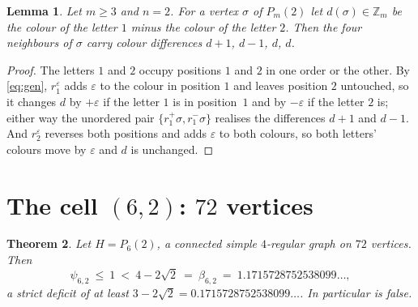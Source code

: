 \documentclass[11pt]{amsart}
\newtheorem{theorem}{Theorem}
\newtheorem{lemma}[theorem]{Lemma}
\theoremstyle{remark}
\newcommand{\Zm}{\mathbb Z_m}
\begin{document}
\begin{lemma}\label{lem:law}
Let $m\ge3$ and $n=2$. For a vertex $\sigma$ of $P_m(2)$ let $d(\sigma)\in\Zm$ be the colour
of the letter $1$ minus the colour of the letter $2$. Then the four neighbours of $\sigma$
carry colour differences $d+1$, $d-1$, $d$, $d$.
\end{lemma}

\begin{proof}
The letters $1$ and $2$ occupy positions $1$ and $2$ in one order or the other. By
\eqref{eq:gen}, $r_1^{\varepsilon}$ adds $\varepsilon$ to the colour in position $1$ and
leaves position $2$ untouched, so it changes $d$ by $+\varepsilon$ if the letter $1$ is in
position~$1$ and by $-\varepsilon$ if the letter $2$ is; either way the unordered pair
$\{r_1^{+}\sigma,r_1^{-}\sigma\}$ realises the differences $d+1$ and $d-1$. And
$r_2^{\varepsilon}$ reverses both positions and adds $\varepsilon$ to both colours, so both
letters' colours move by $\varepsilon$ and $d$ is unchanged.
\end{proof}

\section{The cell $(6,2)$: $72$ vertices}

\begin{theorem}\label{thm:62}
Let $H=P_6(2)$, a connected simple $4$-regular graph on $72$ vertices. Then
\[
 \psi_{6,2}\ \le\ 1\ <\ 4-2\sqrt2\ =\ \beta_{6,2}\ =\ 1.1715728752538099\ldots,
\]
a strict deficit of at least $3-2\sqrt2=0.1715728752538099\ldots$. In particular
\cite[Conjecture~2]{GZ} is false.
\end{theorem}
\end{document}
